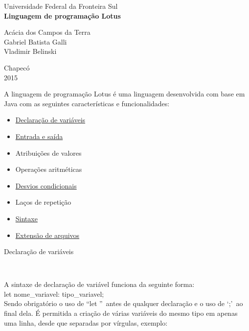 \documentclass[12pt,a4paper]{article}
\begin{document}
\begin{titlepage}
\begin{center}
{\large Universidade Federal da Fronteira Sul}\\[5.5cm]
{\bf \huge Linguagem de programação Lotus}\\[4.9cm]
\end{center}
{\large Acácia dos Campos da Terra}\\
{\large Gabriel Batista Galli}\\
{\large Vladimir Belinski}\\[5.8cm]
\begin{center}
{\large Chapecó}\\[0.1cm]
{\large 2015}
\end{center}
\end{titlepage}

A linguagem de programação Lotus é uma linguagem desenvolvida com base em Java com as seguintes características e funcionalidades:\\

\begin{itemize}
\item \hyperlink{Declaração de variáveis}{Declaração de variáveis}
\item \hyperlink{Entrada e saída}{Entrada e saída}
\item Atribuições de valores
\item Operações aritméticas
\item \hyperlink{Desvios condicionais}{Desvios condicionais}
\item Laços de repetição
\item \hyperlink{Sintaxe}{Sintaxe}
\item \hyperlink{Extensão de arquivos}{Extensão de arquivos}\\[15.4cm]
\end{itemize}

\hypertarget{Declaração de variáveis}{\Large{Declaração de variáveis}}\\[0.3cm]
\normalsize

A sintaxe de declaração de variável funciona da seguinte forma:\\

let nome\_variavel: tipo\_variavel;\\

Sendo obrigatório o uso de ``let ''\ antes de qualquer declaração e o uso de `;'\ ao final dela. É permitida a criação de várias variáveis do mesmo tipo em apenas uma linha, desde que separadas por vírgulas, exemplo:\\
\end{document}

